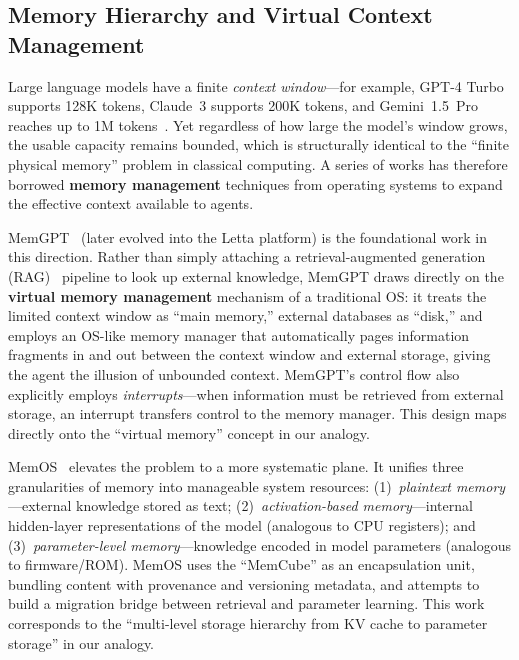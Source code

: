 \documentclass[11pt,a4paper]{article}
\begin{document}
\subsection{Memory Hierarchy and Virtual Context Management}
\label{sec:related-memory}

Large language models have a finite \textit{context window}---for example, GPT-4 Turbo supports 128K tokens, Claude~3 supports 200K tokens, and Gemini~1.5~Pro reaches up to 1M tokens~\cite{gemini2024}.
Yet regardless of how large the model's window grows, the usable capacity remains bounded, which is structurally identical to the ``finite physical memory'' problem in classical computing.
A series of works has therefore borrowed \textbf{memory management} techniques from operating systems to expand the effective context available to agents.

MemGPT~\cite{memgpt2023} (later evolved into the Letta platform) is the foundational work in this direction.
Rather than simply attaching a retrieval-augmented generation (RAG)~\cite{lewis2020rag} pipeline to look up external knowledge, MemGPT draws directly on the \textbf{virtual memory management} mechanism of a traditional OS:
it treats the limited context window as ``main memory,'' external databases as ``disk,'' and employs an OS-like memory manager that automatically pages information fragments in and out between the context window and external storage, giving the agent the illusion of unbounded context.
MemGPT's control flow also explicitly employs \textit{interrupts}---when information must be retrieved from external storage, an interrupt transfers control to the memory manager.
This design maps directly onto the ``virtual memory'' concept in our analogy.

MemOS~\cite{memos2025} elevates the problem to a more systematic plane.
It unifies three granularities of memory into manageable system resources:
(1)~\textit{plaintext memory}---external knowledge stored as text;
(2)~\textit{activation-based memory}---internal hidden-layer representations of the model (analogous to CPU registers); and
(3)~\textit{parameter-level memory}---knowledge encoded in model parameters (analogous to firmware/ROM).
MemOS uses the ``MemCube'' as an encapsulation unit, bundling content with provenance and versioning metadata, and attempts to build a migration bridge between retrieval and parameter learning.
This work corresponds to the ``multi-level storage hierarchy from KV cache to parameter storage'' in our analogy.
\end{document}
